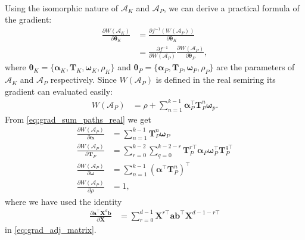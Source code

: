 \paragraph{} Using the isomorphic nature of $\mathcal{A}_K$ and $\mathcal{A}_P$, we can derive a practical formula of the gradient:
\begin{align}
    \frac{\partial W(\mathcal{A}_K)}{\partial \boldsymbol{\theta}_K} &= \frac{\partial f^{-1}( W(\mathcal{A}_P) ) }{\partial \boldsymbol{\theta}_K} \\
    &= \frac{\partial f^{-1}}{\partial W(\mathcal{A}_P)} \frac{\partial W(\mathcal{A}_P)}{\partial \boldsymbol{\theta}_P}, \label{eq:grad_sum_paths}
\end{align}
where $\boldsymbol{\theta}_K = \{ \boldsymbol{\alpha}_K,  \mathbf{T}_K, \boldsymbol{\omega}_K, \rho_K \}$ and $\boldsymbol{\theta}_P = \{ \boldsymbol{\alpha}_P,  \mathbf{T}_P, \boldsymbol{\omega}_P, \rho_P \}$ are the parameters of 
$\mathcal{A}_K$ and $\mathcal{A}_P$ respectively. Since $W(\mathcal{A}_P)$ is defined in the real semiring its gradient can evaluated easily:
\begin{align}
    W(\mathcal{A}_P) &= \rho + \sum_{n=1}^{k-1} \boldsymbol{\alpha}_P^{\top} \mathbf{T}_P^{n} \boldsymbol{\omega}_p. \label{eq:grad_sum_paths_real}
\end{align}
From \eqref{eq:grad_sum_paths_real} we get
\begin{align}
    \frac{\partial W(\mathcal{A}_P)}{\partial \boldsymbol{\alpha}} &= \sum_{n=1}^{k-1} \mathbf{T}_P^n \boldsymbol{\omega}_P \\
    \frac{\partial W(\mathcal{A}_P)}{\partial \mathbf{T}_P} &= \sum_{r=0}^{k - 2} \sum_{q=0}^{k-2-r} \mathbf{T}_P^{r \top} \boldsymbol{\alpha}_P \boldsymbol{\omega}_P^\top \mathbf{T}_P^{q \top} \label{eq:grad_adj_matrix}\\
    \frac{\partial W(\mathcal{A}_P)}{\partial \boldsymbol{\omega}} &= \sum_{n=1}^{k-1} (\boldsymbol{\alpha}^\top \mathbf{T}_P^n)^\top \\
    \frac{\partial W(\mathcal{A}_P)}{\partial \rho} &= 1,
\end{align}
where we have used the identity
\begin{align}
    \frac{\partial \mathbf{a}^\top \mathbf{X}^d \mathbf{b}}{\partial \mathbf{X}} &= \sum_{r=0}^{d-1} \mathbf{X}^{r\top} \mathbf{a} \mathbf{b}^\top \mathbf{X}^{d - 1 - r \top}
\end{align}
in \eqref{eq:grad_adj_matrix}.



